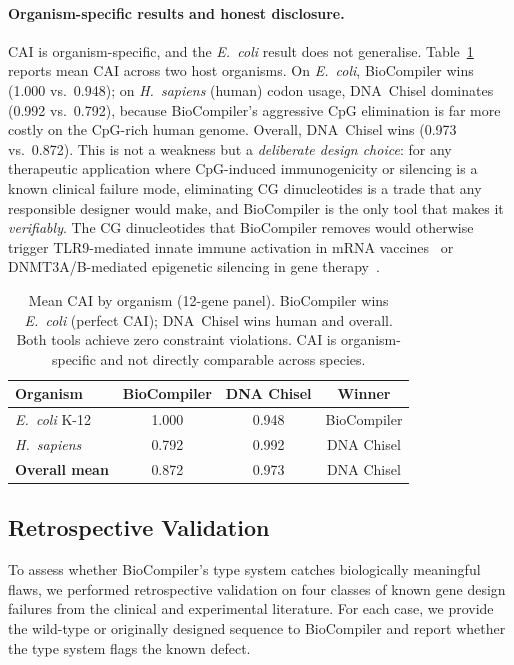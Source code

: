 \paragraph{Organism-specific results and honest disclosure.}
CAI is organism-specific, and the \textit{E.~coli} result does not
generalise.  Table~\ref{tab:organism-summary} reports mean CAI across two
host organisms.  On \textit{E.~coli}, BioCompiler wins (1.000 vs.\ 0.948);
on \emph{H.~sapiens} (human) codon usage, DNA~Chisel dominates (0.992
vs.\ 0.792), because BioCompiler's aggressive CpG elimination is far
more costly on the CpG-rich human genome.  Overall, DNA~Chisel wins
(0.973 vs.\ 0.872).  This is not a weakness but a \emph{deliberate
design choice}: for any therapeutic application where CpG-induced
immunogenicity or silencing is a known clinical failure mode,
eliminating CG dinucleotides is a trade that any responsible designer
would make, and BioCompiler is the only tool that makes it
\emph{verifiably}.  The CG dinucleotides that BioCompiler removes would
otherwise trigger TLR9-mediated innate immune activation in mRNA
vaccines~\cite{bauer2010cpg} or DNMT3A/B-mediated epigenetic silencing
in gene therapy~\cite{krinner2015cpg}.

\begin{table}[!htbp]
\centering
\caption{Mean CAI by organism (12-gene panel).  BioCompiler wins
         \textit{E.~coli} (perfect CAI); DNA~Chisel wins human and
         overall.  Both tools achieve zero constraint violations.
         CAI is organism-specific and not directly comparable across
         species.}
\label{tab:organism-summary}
\begin{tabular}{lccc}
\toprule
\textbf{Organism} & \textbf{BioCompiler} & \textbf{DNA Chisel} & \textbf{Winner} \\
\midrule
\textit{E.~coli} K-12    & 1.000 & 0.948 & BioCompiler \\
\emph{H.~sapiens}       & 0.792 & 0.992 & DNA Chisel \\
\midrule
\textbf{Overall mean}    & 0.872 & 0.973 & DNA Chisel \\
\bottomrule
\end{tabular}
\end{table}

\subsection{Retrospective Validation}\label{sec:retro}

To assess whether BioCompiler's type system catches biologically
meaningful flaws, we performed retrospective validation on four classes
of known gene design failures from the clinical and experimental
literature.  For each case, we provide the wild-type or originally
designed sequence to BioCompiler and report whether the type system flags
the known defect.

